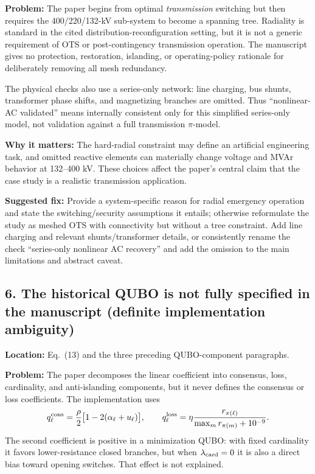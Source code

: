 \documentclass[11pt]{article}
\newcommand{\loc}[1]{\textbf{Location:} #1}
\newcommand{\problem}{\textbf{Problem:}}
\newcommand{\impact}{\textbf{Why it matters:}}
\newcommand{\fix}{\textbf{Suggested fix:}}
\begin{document}
\problem{} The paper begins from optimal \emph{transmission} switching but then
requires the 400/220/132-kV sub-system to become a spanning tree.  Radiality is
standard in the cited distribution-reconfiguration setting, but it is not a
generic requirement of OTS or post-contingency transmission operation.  The
manuscript gives no protection, restoration, islanding, or operating-policy
rationale for deliberately removing all mesh redundancy.

The physical checks also use a series-only network: line charging, bus shunts,
transformer phase shifts, and magnetizing branches are omitted.  Thus
``nonlinear-AC validated'' means internally consistent only for this simplified
series-only model, not validation against a full transmission $\pi$-model.

\impact{} The hard-radial constraint may define an artificial engineering task,
and omitted reactive elements can materially change voltage and MVAr behavior
at 132--400 kV.  These choices affect the paper's central claim that the case
study is a realistic transmission application.

\fix{} Provide a system-specific reason for radial emergency operation and
state the switching/security assumptions it entails; otherwise reformulate the
study as meshed OTS with connectivity but without a tree constraint.  Add line
charging and relevant shunts/transformer details, or consistently rename the
check ``series-only nonlinear AC recovery'' and add the omission to the main
limitations and abstract caveat.

\subsection*{6. The historical QUBO is not fully specified in the manuscript
(definite implementation ambiguity)}

\loc{Eq.~(13) and the three preceding QUBO-component paragraphs.}

\problem{} The paper decomposes the linear coefficient into consensus, loss,
cardinality, and anti-islanding components, but it never defines the consensus
or loss coefficients.  The implementation uses
\[
 q^{\rm cons}_\ell=\frac{\rho}{2}
 \bigl[1-2(\alpha_\ell+u_\ell)\bigr],\qquad
 q^{\rm loss}_\ell=\eta
 \frac{r_{\pi(\ell)}}{\max_m r_{\pi(m)}+10^{-9}}.
\]
The second coefficient is positive in a minimization QUBO: with fixed
cardinality it favors lower-resistance closed branches, but when
$\lambda_{\rm card}=0$ it is also a direct bias toward opening switches.  That
effect is not explained.
\end{document}
